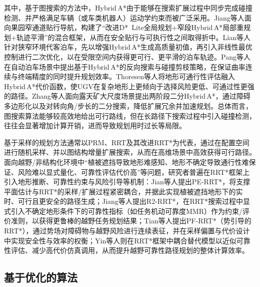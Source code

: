 \documentclass{iopjournal}
\begin{document}
其中，基于图搜索的方法中，Hybrid\,A*由于能够在搜索扩展过程中同步完成碰撞检测、并严格满足车辆（或车类机器人）运动学约束而被广泛采用。Jiang等人\cite{jiang2025hybrid}面向果园窄通道贴行导航，构建了``改进D*~Lite全局规划+窄段Hybrid\,A*局部重规划+轨迹平滑''的混合框架，从而在安全贴行与可执行性之间取得折中。Lian等人\cite{lian2023trajectory}针对狭窄环境代客泊车，先以增强Hybrid\,A*生成高质量初值，再引入非线性最优控制进行二次优化，以在受限空间内获得更可行、更平滑的泊车轨迹。Pang等人\cite{pang2022curvature}在自动泊车场景中提出基于Hybrid\,A*的反向搜索与碰撞剪枝策略，在保证曲率连续与终端精度的同时提升规划效率。Thoresen等人\cite{thoresen2021path}将地形可通行性评估融入Hybrid\,A*代价函数，使UGV在复杂地形上更倾向于选择风险更低、可通过性更强的路径。Zhang等人\cite{zhang2024twostage}面向露天矿大尺度场景提出两阶段二分Hybrid\,A*，通过障碍多边形化以及对转向角/步长的二分搜索，降低扩展冗余并加速规划。总体而言，图搜索算法能够较高效地给出可行路线，但在长路径下搜索过程中引入碰撞检测，往往会显著增加计算开销，进而导致规划用时过长等局限。

基于采样的规划方法通常以PRM、RRT及其改进RRT*为代表，通过在配置空间进行随机采样、并以图结构增量扩展搜索，从而在高维场景中高效获得可行路径。面向越野/非结构化环境中``植被遮挡导致地形难感知、地形不确定导致通行性难保证、风险难以显式量化、可靠性评估代价高''等问题，研究者普遍在RRT*框架上引入地形推断、可靠性约束与风险引导等机制：Jian等人\cite{jian2024path}提出PE-RRT*，将支撑平面估计与RRT*的采样/扩展过程紧密耦合，并据此实现植被遮挡地形下的实时、可行且更安全的路径生成；Jiang等人\cite{jiang2022r2rrt}提出R2-RRT*，在RRT*搜索过程中显式引入不确定地形条件下的可靠性指标（如任务机动可靠度MMR）作为约束/评价准则，以获得更鲁棒的越野任务规划结果；Tian等人\cite{tian2023driving}提出PF-RRT*（势引导的RRT*），通过势场对障碍物与越野风险进行连续表征，并在采样偏置与代价设计中实现安全性与效率的权衡；Yin等人\cite{yin2023efficient}则在RRT*框架中耦合替代模型以近似可靠性评估、减少高代价仿真调用，从而提升越野可靠性路径规划的整体计算效率。

\subsection{基于优化的算法}
\end{document}
